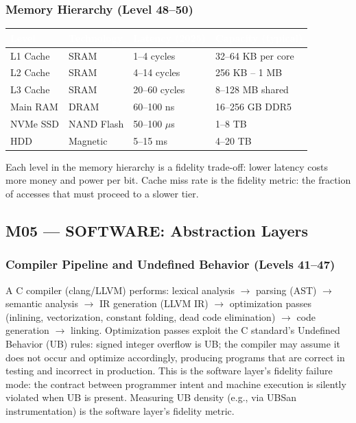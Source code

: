 \documentclass[11pt,letterpaper]{article}
\newcommand{\tableheader}[1]{\textbf{\sffamily\textcolor{white}{#1}}}
\begin{document}
\subsubsection{Memory Hierarchy (Level 48--50)}

\begin{center}
\begin{tabularx}{\textwidth}{L{2.3cm}L{2cm}L{2.8cm}X}
\toprule
{}
\tableheader{Level} & \tableheader{Technology} & \tableheader{Latency (2025)} & \tableheader{Capacity (typical)} \\
\midrule
L1 Cache & SRAM & 1--4 cycles & 32--64 KB per core \\
L2 Cache & SRAM & 4--14 cycles & 256 KB -- 1 MB \\
L3 Cache & SRAM & 20--60 cycles & 8--128 MB shared \\
Main RAM & DRAM & 60--100 ns & 16--256 GB DDR5 \\
NVMe SSD & NAND Flash & 50--100 $\mu$s & 1--8 TB \\
HDD & Magnetic & 5--15 ms & 4--20 TB \\
\bottomrule
\end{tabularx}
\end{center}

Each level in the memory hierarchy is a fidelity trade-off: lower latency costs more money and
power per bit. Cache miss rate is the fidelity metric: the fraction of accesses that must proceed
to a slower tier.

\subsection{M05 --- SOFTWARE: Abstraction Layers}

\subsubsection{Compiler Pipeline and Undefined Behavior (Levels 41--47)}

A C compiler (clang/LLVM) performs: lexical analysis $\rightarrow$ parsing (AST) $\rightarrow$ 
semantic analysis $\rightarrow$ IR generation (LLVM IR) $\rightarrow$ optimization passes
(inlining, vectorization, constant folding, dead code elimination) $\rightarrow$ code generation
$\rightarrow$ linking. Optimization passes exploit the C standard's Undefined Behavior (UB) rules:
signed integer overflow is UB; the compiler may assume it does not occur and optimize accordingly,
producing programs that are correct in testing and incorrect in production. This is the software
layer's fidelity failure mode: the contract between programmer intent and machine execution is
silently violated when UB is present. Measuring UB density (e.g., via UBSan instrumentation) is
the software layer's fidelity metric.
\end{document}

